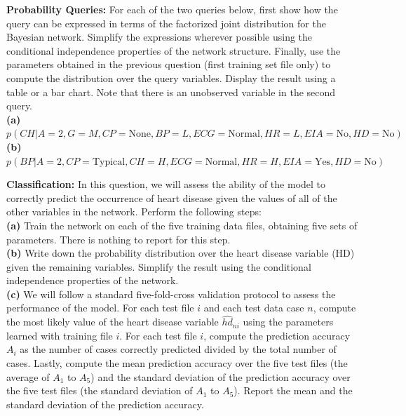 \documentclass[11pt]{article}
\begin{document}
\begin{problem}{15} \textbf{Probability Queries:}
For each of the two queries below, first show how the query can be expressed in terms of the factorized joint distribution for the Bayesian network. Simplify the expressions wherever possible using the conditional independence properties of the network structure. Finally, use the parameters obtained in the previous question (first training set file only) to compute the distribution over the query variables. Display the result using a table or a bar chart. Note that there is an unobserved variable in the second query.\\

\textbf{(a)} {\footnotesize $p(CH|A=2,G=M,CP=\text{None},BP=L,ECG=\text{Normal},HR=L,EIA=\text{No},HD=\text{No})$}\\
\textbf{(b)} {\footnotesize $p(BP|A=2,CP=\text{Typical},CH=H,ECG=\text{Normal},HR=H,EIA=\text{Yes},HD=\text{No})$}

\end{problem}

\begin{problem}{20} \textbf{Classification:}
In this question, we will assess the ability of the model to correctly predict the occurrence of heart disease given the values of all of the other variables in the network. Perform the following steps:\\

\textbf{(a)} Train the network on each of the five training data files, obtaining five sets of parameters. There is nothing to report for this step. \\

\textbf{(b)} Write down the probability distribution over the heart disease variable (HD) given the remaining variables. Simplify the result using the conditional independence properties of the network. \\

\textbf{(c)} We will follow a standard five-fold-cross validation protocol to assess the performance of the model. For each test file $i$ and each test data case $n$, compute the most likely value of the heart disease variable $\hat{hd}_{ni}$ using the parameters learned with training file $i$. For each test file $i$, compute the prediction accuracy $A_i$ as the number of cases correctly predicted divided by the total number of cases. Lastly, compute the mean prediction accuracy over the five test files (the average of $A_1$ to $A_5$) and the standard deviation of the prediction accuracy over the five test files (the standard deviation of $A_1$ to $A_5$). Report the mean and the standard deviation of the prediction accuracy.
\end{problem}
\end{document}
